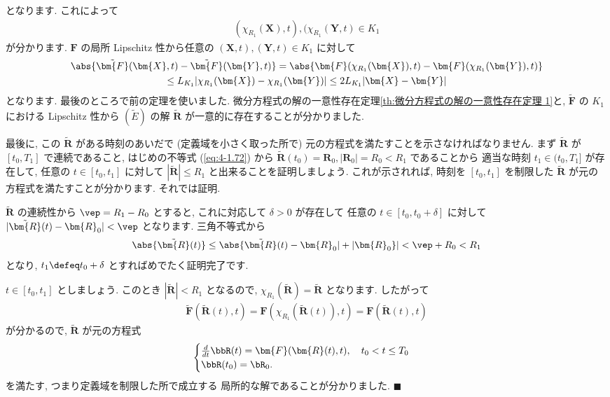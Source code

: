 \documentclass[openany, a4paper, oneside]{jsbook}
\begin{document}
となります.
これによって
\begin{gather}
( \chi_{R_1} ( \bm{X} ) , t ) , ( \chi_{R_1} ( \bm{Y} , t ) \in K_1
\end{gather}
が分かります.
$\bm{F}$ の局所 Lipschitz 性から任意の $(\bm{X} , t ) , ( \bm{Y} , t )  \in K_1$ に対して
\begin{gather}
\abs{\tilde{ \bm{F} } ( \bm{X} , t ) - \tilde{ \bm{F} } ( \bm{Y} , t )}
=
\abs{\bm{F} ( \chi_{R_1} ( \bm{X} ) , t ) - \bm{F} ( \chi_{R_1} ( \bm{Y} ) , t )}\\
\leq
L_{K_1} | \chi_{R_1} ( \bm{X} ) - \chi_{R_1} ( \bm{Y} )  |
\leq
2 L_{K_1} | \bm{X} -  \bm{Y} |
\end{gather}
となります.
最後のところで前の定理を使いました.
微分方程式の解の一意性存在定理\ref{th:微分方程式の解の一意性存在定理 1}と,
$\tilde{ \bm{F} }$ の $K_1$ における Lipschitz 性から
$( \tilde{E} )$ の解 $\tilde{ \bm{R} }$ が一意的に存在することが分かりました.

最後に, この $\tilde{ \bm{R} }$ がある時刻のあいだで (定義域を小さく取った所で)
元の方程式を満たすことを示さなければなりません.
まず $\tilde { \bm{R} }$ が $[ t_0 , T_1 ]$ で連続であること,
はじめの不等式 (\ref{eq:4-1.72}) から
$\tilde{ \bm{R} } (t_0) = \bm{R}_0 , | \bm{R}_0 | = R_0 < R_1$
であることから
適当な時刻 $t_1 \in ( t_0 , T_1]$ が存在して, 任意の
$t \in [t_0 , t_1]$ に対して
$|\tilde{ \bm{R} }| \leq R_1$ と出来ることを証明しましょう.
これが示されれば, 時刻を $[t_0 , t_1]$ を制限した $\tilde{ \bm{R} }$ が元の方程式を満たすことが分かります.
それでは証明.

$\tilde{ \bm{R} }$ の連続性から $\vep = R_1 - R_0$ とすると,
これに対応して $\delta > 0$ が存在して
任意の $t \in [t_0 , t_0 + \delta]$ に対して
$| \tilde{ \bm{R} } (t) - \bm{R}_0 | < \vep$ となります.
三角不等式から
\begin{gather}
\abs{\tilde{ \bm{R} } (t)}
\leq
\abs{\tilde{ \bm{R} } (t) - \bm{R}_0 | + | \bm{R}_0}|
<
\vep + R_0
<
R_1
\end{gather}
となり,  $t_1 \defeq t_0 + \delta$ とすればめでたく証明完了です.

$t \in [ t_0 , t_1 ]$ としましょう.
このとき $| \tilde{ \bm{R} } | < R_1$ となるので,
$\chi _{R_1} ( \tilde{ \bm{R} } ) = \tilde{ \bm{R} }$ となります.
したがって
\begin{gather}
\tilde{ \bm{F} } ( \tilde{ \bm{R} }(t) , t)
=
\bm{F} ( \chi_{R_1} ( \tilde{ \bm{R} } (t) ) , t )
=
\bm{F} ( \tilde{\bm{R}}(t) , t )
\end{gather}
が分かるので,  $\tilde{\bm{R}}$ が元の方程式
\begin{gather}
\begin{cases}
\frac{d} {dt} \bbR (t) = \bm{F} ( \bm{R} (t) , t ), \quad t_0 < t \leq T_0 \\
\bbR (t_0) = \bR_0 .
\end{cases}
\end{gather}
を満たす, つまり定義域を制限した所で成立する
局所的な解であることが分かりました.  $\blacksquare$
\end{document}

